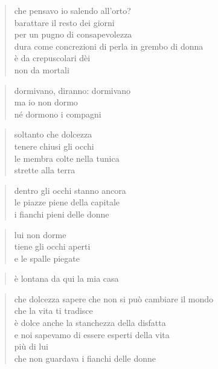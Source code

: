 \begin{verse}
    che pensavo io salendo all'orto?\\
    barattare il resto dei giorni\\
    per un pugno di consapevolezza\\
    dura come concrezioni di perla in grembo di donna\\
    è da crepuscolari dèi\\
    non da mortali
\end{verse}

\clearpage


\begin{verse}
    dormivano, diranno: dormivano\\
    ma io non dormo\\
    né dormono i compagni
\end{verse}

\begin{verse}
    soltanto che dolcezza\\
    tenere chiusi gli occhi\\
    le membra colte nella tunica\\
    strette alla terra
\end{verse}

\begin{verse}
    dentro gli occhi stanno ancora\\
    le piazze piene della capitale\\
    i fianchi pieni delle donne
\end{verse}

\begin{verse}
    lui non dorme\\
    tiene gli occhi aperti\\
    e le spalle piegate
\end{verse}

\begin{verse}
    è lontana da qui la mia casa
\end{verse}

\begin{verse}
    che dolcezza sapere che non si può cambiare il mondo\\
    che la vita ti tradisce\\
    è dolce anche la stanchezza della disfatta\\
    e noi sapevamo di essere esperti della vita\\
    più di lui\\
    che non guardava i fianchi delle donne
\end{verse}

